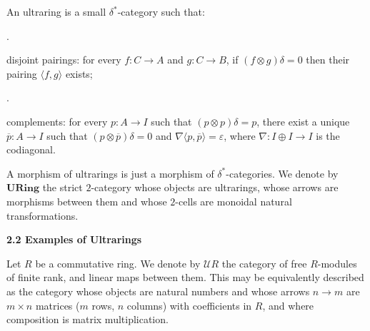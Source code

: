 \documentclass[10pt,a4paper]{amsart}
\begin{document}
 
An ultraring is a small $\delta^{\ast}$-category such that:\par
  
\par{}. 
 
disjoint pairings: for every $f:C\to A$ and $g:C\to B$, if $(f\otimes g)\delta=0$ then their pairing $\langle f,g\rangle$ exists;\par
 
 
 
\par{}. 
 
complements: for every $p:A\to I$ such that $(p\otimes p)\delta=p$, there exist a unique $\overline{p}:A\to I$ such that $(p\otimes\overline{p})\delta=0$ and $\nabla\langle p,\overline{p}\rangle=\varepsilon$, where $\nabla:I\oplus I\to I$ is the codiagonal.\par
 
 
  
 
 
A morphism of ultrarings is just a morphism of $\delta^{\ast}$-categories. We denote by $\mathbf{URing}$ the strict $2$-category whose objects are ultrarings, whose arrows are morphisms between them and whose $2$-cells are monoidal natural transformations.\par
 
 
 
 
 
 
\par\medskip\noindent\textbf{2.2 Examples of Ultrarings}\par
 
 
Let $R$ be a commutative ring. We denote by $\mathcal{U}R$ the category of free $R$-modules of finite rank, and linear maps between them. This may be equivalently described as the category whose objects are natural numbers and whose arrows $n\to m$ are $m\times n$ matrices ($m$ rows, $n$ columns) with coefficients in $R$, and where composition is matrix multiplication.\par
 
\end{document}
